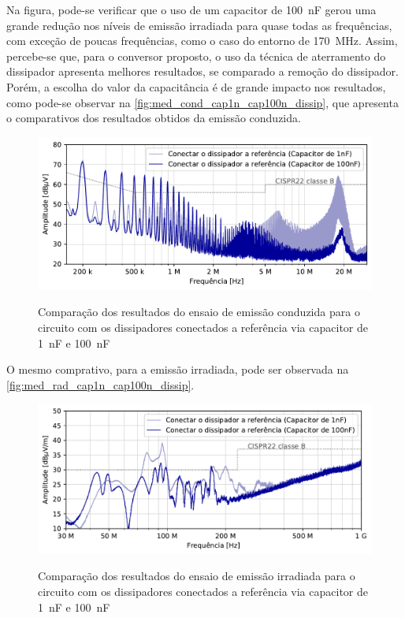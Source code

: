     Na figura, pode-se verificar que o uso de um capacitor de \SI{100}{\nano\farad} gerou uma grande redução nos níveis de emissão irradiada para quase todas as frequências, com exceção de poucas frequências, como o caso do entorno de \SI{170}{\mega\hertz}. Assim, percebe-se que, para o conversor proposto, o uso da técnica de aterramento do dissipador apresenta melhores resultados, se comparado a remoção do dissipador. Porém, a escolha do valor da capacitância é de grande impacto nos resultados, como pode-se observar na \autoref{fig:med_cond_cap1n_cap100n_dissip}, que apresenta o comparativos dos resultados obtidos da emissão conduzida.
    
    \begin{figure}[H]
    	\centering
    	\caption{Comparação dos resultados do ensaio de emissão conduzida para o circuito com os dissipadores conectados a referência via capacitor de \SI{1}{\nano\farad} e \SI{100}{\nano\farad}}
    	\includegraphics[scale=.85]{pdf/cond/cond-Conectar o dissipador a referência (Capacitor de 1nF)-Conectar o dissipador a referência (Capacitor de 100nF).pdf}
    	\label{fig:med_cond_cap1n_cap100n_dissip}
    \end{figure}
    
    O mesmo comprativo, para a emissão irradiada, pode ser observada na \autoref{fig:med_rad_cap1n_cap100n_dissip}.
    
    \begin{figure}[H]
    	\centering
    	\caption{Comparação dos resultados do ensaio de emissão irradiada para o circuito com os dissipadores conectados a referência via capacitor de \SI{1}{\nano\farad} e \SI{100}{\nano\farad}}
    	\includegraphics[scale=.85]{pdf/rad/Conectar o dissipador a referência (Capacitor de 1nF)-Conectar o dissipador a referência (Capacitor de 100nF).pdf}
    	\label{fig:med_rad_cap1n_cap100n_dissip}
    \end{figure}

